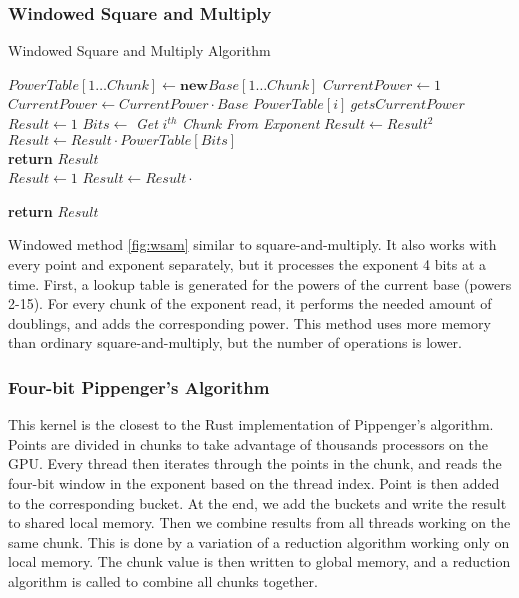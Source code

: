 \subsubsection{Windowed Square and Multiply}
\begin{algorithm}[h]
    \caption{Windowed Square and Multiply Algorithm \cite{knuth2014art}}\label{fig:wsam}
    \begin{algorithmic}[1]
        \State $PowerTable[1 \dots Chunk] \gets \textbf{new} Base[1 \dots Chunk]$
        \State $CurrentPower \gets 1$
        \\
            \State $CurrentPower \gets CurrentPower \cdot Base$
            \State $PowerTable[i] \ gets CurrentPower$
        \EndFor
        \\
        \State $Result \gets 1$
            \State $Bits \gets $ \textit{Get }$i^{th}$ \textit{ Chunk From Exponent}
                \State $Result \gets Result^2$
            \EndFor
            \\
                \State $Result \gets Result \cdot PowerTable[Bits]$
            \EndIf
        \EndFor
        \\
        \State \textbf{return} $Result$
    \EndFunction
    \\
        \State $Result \gets 1$
            \State $Result \gets Result \cdot $
        \EndFor
    
        \State \textbf{return} $Result$
        
    \EndFunction
    \end{algorithmic}
\end{algorithm}
Windowed method \ref{fig:wsam} similar to square-and-multiply. It also works with every point and exponent separately, but it processes the exponent 4 bits at a time. First, a lookup table is generated for the powers of the current base (powers 2-15). For every chunk of the exponent read, it performs the needed amount of doublings, and adds the corresponding power. This method uses more memory than ordinary square-and-multiply, but the number of operations is lower.
\subsubsection{Four-bit Pippenger's Algorithm}
This kernel is the closest to the Rust implementation of Pippenger's algorithm. Points are divided in chunks to take advantage of thousands processors on the GPU. Every thread then iterates through the points in the chunk, and reads the four-bit window in the exponent based on the thread index. Point is then added to the corresponding bucket. At the end, we add the buckets and write the result to shared local memory. Then we combine results from all threads working on the same chunk. This is done by a variation of a reduction algorithm working only on local memory. The chunk value is then written to global memory, and a reduction algorithm is called to combine all chunks together.

